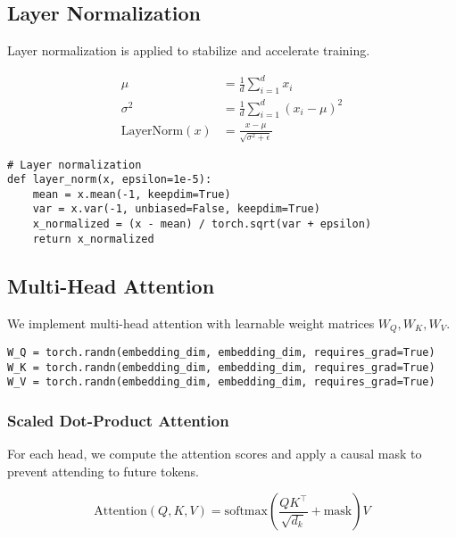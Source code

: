 \documentclass{article}
\begin{document}
\subsection{Layer Normalization}

Layer normalization is applied to stabilize and accelerate training.

\begin{equation}
\begin{aligned}
    \mu &= \frac{1}{d} \sum_{i=1}^{d} x_i \\
    \sigma^2 &= \frac{1}{d} \sum_{i=1}^{d} (x_i - \mu)^2 \\
    \text{LayerNorm}(x) &= \frac{x - \mu}{\sqrt{\sigma^2 + \epsilon}}
\end{aligned}
\end{equation}

\begin{lstlisting}[style=pythonstyle]
# Layer normalization
def layer_norm(x, epsilon=1e-5):
    mean = x.mean(-1, keepdim=True)
    var = x.var(-1, unbiased=False, keepdim=True)
    x_normalized = (x - mean) / torch.sqrt(var + epsilon)
    return x_normalized
\end{lstlisting}

\subsection{Multi-Head Attention}

We implement multi-head attention with learnable weight matrices \( W_Q, W_K, W_V \).

\begin{lstlisting}[style=pythonstyle]
W_Q = torch.randn(embedding_dim, embedding_dim, requires_grad=True)
W_K = torch.randn(embedding_dim, embedding_dim, requires_grad=True)
W_V = torch.randn(embedding_dim, embedding_dim, requires_grad=True)
\end{lstlisting}

\subsubsection{Scaled Dot-Product Attention}

For each head, we compute the attention scores and apply a causal mask to prevent attending to future tokens.

\begin{equation}
\text{Attention}(Q, K, V) = \text{softmax}\left(\frac{Q K^\top}{\sqrt{d_k}} + \text{mask}\right) V
\end{equation}
\end{document}
